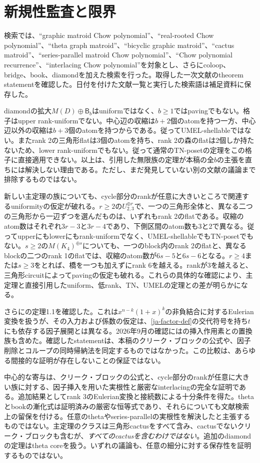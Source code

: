 \documentclass[12pt]{amsart}
\theoremstyle{definition}
\theoremstyle{remark}
\numberwithin{equation}{section}
\newcommand{\Bmat}{\mathsf{B}}
\begin{document}
\section{新規性監査と限界}
検索では、``graphic matroid Chow polynomial''、``real-rooted Chow polynomial''、``theta graph matroid''、``bicyclic graphic matroid''、``cactus matroid''、``series-parallel matroid Chow polynomial''、``Chow polynomial recurrence''、``interlacing Chow polynomial''を対象とし、さらにcoloop、bridge、book、diamondを加えた検索を行った。取得した一次文献のtheorem statementを確認した。日付を付けた文献一覧と実行した検索語は補足資料に保存した。

diamondの拡大$M(D)\oplus\Bmat_b$はuniformではなく、$b\geq1$ではpavingでもない。格子はupper rank-uniformでない。中心辺の収縮は$b+2$個のatomを持つ一方、中心辺以外の収縮は$b+3$個のatomを持つからである。従ってUMEL-shellableではない。またrank 2の三角形flatは3個のatomを持ち、rank 2の森のflatは2個しか持たないため、lower rank-uniformでもない。従って通常のTN-posetの定理をこの格子に直接適用できない。以上は、引用した無限族の定理が本稿の全$b$の主張を直ちには解決しない理由である。ただし、まだ発見していない別の文献の議論まで排除するものではない。


新しい主定理の族についても、cycle部分のrankが任意に大きいところで関連するuniformityの仮定が破れる。$r\geq2$の$U_{2,3}^{\oplus r}$で、一つの三角形全体と、異なる二つの三角形から一辺ずつを選んだものは、いずれもrank 2のflatである。収縮のatom数はそれぞれ$3r-3$と$3r-4$であり、下側区間のatom数も3と2で異なる。従ってupperにもlowerにもrank-uniformでなく、UMEL-shellableでもTN-posetでもない。$s\geq2$の$M(K_4)^{\oplus s}$についても、一つのblock内のrank 2のflatと、異なるblockの二つのrank 1のflatでは、収縮のatom数が$6s-5$と$6s-6$となる。$r\geq4$または$s\geq3$をとれば、橋を一つも加えずにrank 6を越える。rankが3を越えると、三角形circuitによってpavingの仮定も破れる。これらの具体的な確認により、主定理と直接引用したuniform、低rank、TN、UMELの定理との差が明らかになる。

さらに\cite{Ath25}の定理1.1を確認した。これは$x^{n-k}(1+x)^k$の非負結合に対するEulerian変換を扱うが、その入力および係数の仮定は、\eqref{ja-factor-def}の交代符号を持ち$t$にも依存する因子展開とは異なる。2026年9月の確認には\cite{Ma26}の挿入作用素と\cite{AlexE26}の置換族も含めた。確認したstatementは、本稿のクリーク・ブロックの公式や、因子削除とコループの同時帰納法を同定するものではなかった。この比較は、あらゆる間接的な証明が存在しないことの保証ではない。

中心的な寄与は、クリーク・ブロックの公式と、cycle部分のrankが任意に大きい族に対する、因子挿入を用いた実根性と厳密なinterlacingの完全な証明である。追加結果としてrank 3のEulerian変換と接続数による十分条件を得た。thetaとbookの漸化式は証明済みの厳密な恒等式であり、それらについても文献検索上の留保を付ける。任意のthetaやseries-parallelの実根性を解決したと主張するものではない。主定理のクラスは三角形cactusをすべて含み、cactusでないクリーク・ブロックも含むが、\emph{すべてのcactusを含むわけではない}。追加のdiamondの定理はtheta coreを扱う。いずれの議論も、任意の細分に対する保存性を証明するものではない。
\end{document}
